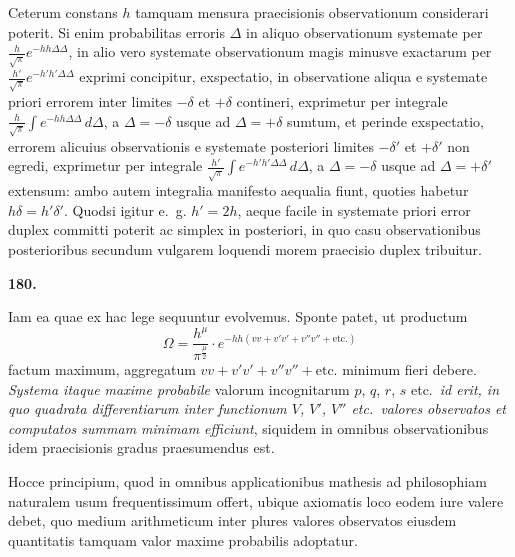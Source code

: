 \documentclass[11pt,a4paper]{article}
\begin{document}
Ceterum constans $h$ tamquam mensura praecisionis observationum considerari poterit. Si enim probabilitas erroris $\Delta$ in aliquo observationum systemate per $\frac{h}{\sqrt{\pi}}e^{-hh\Delta\Delta}$, in alio vero systemate observationum magis minusve exactarum per $\frac{h'}{\sqrt{\pi}}e^{-h'h'\Delta\Delta}$ exprimi concipitur, exspectatio, in observatione aliqua e systemate priori errorem inter limites $-\delta$ et $+\delta$ contineri, exprimetur per integrale $\frac{h}{\sqrt{\pi}}\int e^{-hh\Delta\Delta} \, d\Delta$, a $\Delta = -\delta$ usque ad $\Delta = +\delta$ sumtum, et perinde exspectatio, errorem alicuius observationis e systemate posteriori limites $-\delta'$ et $+\delta'$ non egredi, exprimetur per integrale $\frac{h'}{\sqrt{\pi}}\int e^{-h'h'\Delta\Delta} \, d\Delta$, a $\Delta = -\delta$ usque ad $\Delta = +\delta'$ extensum: ambo autem integralia manifesto aequalia fiunt, quoties habetur $h\delta = h'\delta'$. Quodsi igitur e.~g. $h' = 2h$, aeque facile in systemate priori error duplex committi poterit ac simplex in posteriori, in quo casu observationibus posterioribus secundum vulgarem loquendi morem praecisio duplex tribuitur.

\newpage
\setcounter{page}{253}

\noindent\textbf{180.}

Iam ea quae ex hac lege sequuntur evolvemus. Sponte patet, ut productum
\[
\Omega = \frac{h^\mu}{\pi^{\frac{\mu}{2}}} \cdot e^{-hh(vv + v'v' + v''v'' + \text{etc.})}
\]
factum maximum, aggregatum $vv + v'v' + v''v'' + \text{etc.}$ minimum fieri debere. \emph{Systema itaque maxime probabile} valorum incognitarum $p$, $q$, $r$, $s$ etc.\ \emph{id erit, in quo quadrata differentiarum inter functionum $V$, $V'$, $V''$ etc.\ valores observatos et computatos summam minimam efficiunt}, siquidem in omnibus observationibus idem praecisionis gradus praesumendus est.

Hocce principium, quod in omnibus applicationibus mathesis ad philosophiam naturalem usum frequentissimum offert, ubique axiomatis loco eodem iure valere debet, quo medium arithmeticum inter plures valores observatos eiusdem quantitatis tamquam valor maxime probabilis adoptatur.
\end{document}
